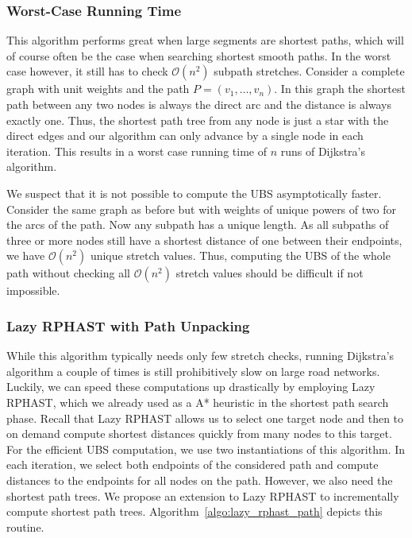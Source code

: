 \documentclass[a4paper,UKenglish,cleveref, autoref, thm-restate]{lipics-v2021}
\begin{document}

\subsubsection{Worst-Case Running Time}

This algorithm performs great when large segments are shortest paths, which will of course often be the case when searching shortest smooth paths.
In the worst case however, it still has to check $\mathcal{O}(n^2)$ subpath stretches.
Consider a complete graph with unit weights and the path $P=(v_1, \dots, v_n)$.
In this graph the shortest path between any two nodes is always the direct arc and the distance is always exactly one.
Thus, the shortest path tree from any node is just a star with the direct edges and our algorithm can only advance by a single node in each iteration.
This results in a worst case running time of $n$ runs of Dijkstra's algorithm.

We suspect that it is not possible to compute the UBS asymptotically faster.
Consider the same graph as before but with weights of unique powers of two for the arcs of the path.
Now any subpath has a unique length.
As all subpaths of three or more nodes still have a shortest distance of one between their endpoints, we have $\mathcal{O}(n^2)$ unique stretch values.
Thus, computing the UBS of the whole path without checking all $\mathcal{O}(n^2)$ stretch values should be difficult if not impossible.

\subsubsection{Lazy RPHAST with Path Unpacking}
\label{sec:lazy_rphast_path}

While this algorithm typically needs only few stretch checks, running Dijkstra's algorithm a couple of times is still prohibitively slow on large road networks.
Luckily, we can speed these computations up drastically by employing Lazy RPHAST, which we already used as a A* heuristic in the shortest path search phase.
Recall that Lazy RPHAST allows us to select one target node and then to on demand compute shortest distances quickly from many nodes to this target.
For the efficient UBS computation, we use two instantiations of this algorithm.
In each iteration, we select both endpoints of the considered path and compute distances to the endpoints for all nodes on the path.
However, we also need the shortest path trees.
We propose an extension to Lazy RPHAST to incrementally compute shortest path trees.
Algorithm~\ref{algo:lazy_rphast_path} depicts this routine.
\end{document}
